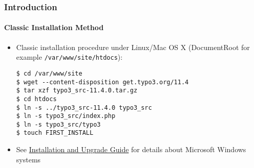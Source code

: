 %

\begin{frame}[fragile]
	\frametitle{Introduction}
	\framesubtitle{Classic Installation Method}


	\begin{itemize}
		\item Classic installation procedure under Linux/Mac OS X\newline
			(DocumentRoot for example \texttt{/var/www/site/htdocs}):
\begin{lstlisting}
$ cd /var/www/site
$ wget --content-disposition get.typo3.org/11.4
$ tar xzf typo3_src-11.4.0.tar.gz
$ cd htdocs
$ ln -s ../typo3_src-11.4.0 typo3_src
$ ln -s typo3_src/index.php
$ ln -s typo3_src/typo3
$ touch FIRST_INSTALL
\end{lstlisting}

		\item See \href{https://docs.typo3.org/m/typo3/guide-installation/master/en-us/}{Installation and Upgrade Guide}
			for details about Microsoft Windows systems

	\end{itemize}
\end{frame}

